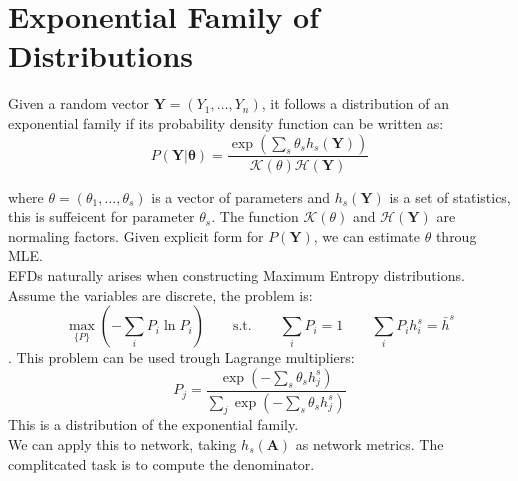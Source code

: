 \section{Exponential Family of Distributions}
\begin{mydefinition}
	Given a random vector $\mathbf{Y} = (Y_1,\ldots,Y_n)$, it follows a distribution of an exponential family if its probability density function can be written as:
	\[
	P(\mathbf{Y| \theta}) = \frac{\exp(\sum_s \theta_s h_s(\mathbf{Y}))}{\mathcal{K}(\theta) \mathcal{H}(\mathbf{Y})}
	\]
\end{mydefinition}
where $\theta = (\theta_1,\ldots, \theta_s)$ is a vector of parameters and $h_s(\mathbf{Y})$ is a set  of statistics, this is suffeicent for parameter $\theta_s$. The function $\mathcal{K}(\theta)$ and $\mathcal{H}(\mathbf{Y})$ are normaling factors. Given explicit form for $P(\mathbf{Y})$, we can estimate $\theta$ throug MLE.\\
EFDs naturally arises when constructing Maximum Entropy distributions. Assume the variables are discrete, the problem is:
\[
\max_{\{P\}} \left(- \sum_i P_i \ln P_i\right) \qquad \text{s.t.} \qquad \sum_i P_i = 1 \qquad \sum_i P_ih_i^s = \bar{h}^s
\].
This problem can be used trough Lagrange multipliers:
\[
P_j = \frac{\exp(-\sum_s \theta_s h_j^s)}{\sum_j \exp (-\sum_s \theta_sh_j^s)}
\]
This is  a distribution of the exponential family.\\
We can apply this to network, taking $h_s(\mathbf{A})$ as network metrics. The complitcated task is to compute the denominator.
